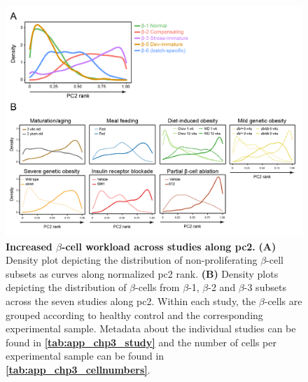 \begin{figure}[H]
\centering
\includegraphics[width=\linewidth]{Appendix2/Fig/F3-7-03.png}
\caption[Increased $\beta$-cell workload across studies along 2]{\textbf{Increased $\beta$-cell workload across studies along \gls{pc}2.} \textbf{(A)} Density plot depicting the distribution of non-proliferating $\beta$-cell subsets as curves along normalized \gls{pc}2 rank. \textbf{(B)} Density plots depicting the distribution of $\beta$-cells from $\beta$-1, $\beta$-2 and $\beta$-3 subsets across the seven studies along \gls{pc}2. Within each study, the $\beta$-cells are grouped according to healthy control and the corresponding experimental sample. Metadata about the individual studies can be found in \textbf{\autoref{tab:app_chp3_study}} and the number of cells per experimental sample can be found in \textbf{\autoref{tab:app_chp3_cellnumbers}}.}
\label{fig:app_chp3_pc2}
\end{figure}

\clearpage


